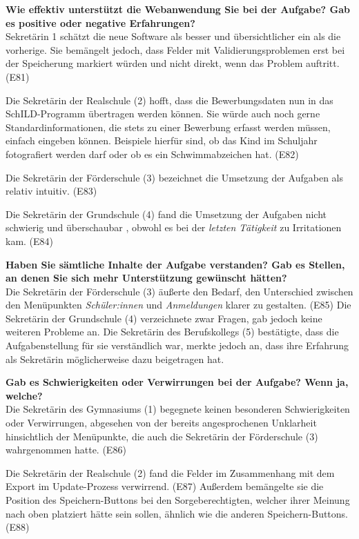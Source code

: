 \textbf{Wie effektiv unterstützt die Webanwendung Sie bei der Aufgabe?  Gab es positive oder negative Erfahrungen?}\\
Sekretärin 1 schätzt die neue Software als besser und übersichtlicher ein als die vorherige. Sie bemängelt jedoch, dass Felder mit Validierungsproblemen erst bei der Speicherung markiert würden und nicht direkt, wenn das Problem auftritt. (E81)

Die Sekretärin der Realschule (2) hofft, dass die Bewerbungsdaten nun in das SchILD-Programm übertragen werden können. Sie würde auch noch gerne \glqq Standardinformationen\grqq{}, die stets zu einer Bewerbung erfasst werden müssen, einfach eingeben können. Beispiele hierfür sind, ob das Kind im Schuljahr fotografiert werden darf oder ob es ein Schwimmabzeichen hat. (E82) 

Die Sekretärin der Förderschule (3) bezeichnet die Umsetzung der Aufgaben als \glqq relativ intuitiv\grqq{}. (E83)

Die Sekretärin der Grundschule (4) fand die Umsetzung der Aufgaben \glqq nicht schwierig\grqq{}  und \glqq überschaubar\grqq{} , obwohl es bei der \textit{letzten Tätigkeit} zu Irritationen kam. (E84)

\textbf{Haben Sie sämtliche Inhalte der Aufgabe verstanden? Gab es Stellen, an denen Sie sich mehr Unterstützung gewünscht hätten?}\\
Die Sekretärin der Förderschule (3) äußerte den Bedarf, den Unterschied zwischen den Menüpunkten \textit{Schüler:innen} und \textit{Anmeldungen} klarer zu gestalten. (E85) Die Sekretärin der Grundschule (4) verzeichnete zwar Fragen, gab jedoch keine weiteren Probleme an. Die Sekretärin des Berufskollegs (5) bestätigte, dass die Aufgabenstellung für sie verständlich war, merkte jedoch an, dass ihre Erfahrung als Sekretärin möglicherweise dazu beigetragen hat.

\textbf{Gab es Schwierigkeiten oder Verwirrungen bei der Aufgabe? Wenn ja, welche?}\\
Die Sekretärin des Gymnasiums (1) begegnete keinen besonderen Schwierigkeiten oder Verwirrungen, abgesehen von der bereits angesprochenen Unklarheit hinsichtlich der Menüpunkte, die auch die Sekretärin der Förderschule (3) wahrgenommen hatte. (E86)

Die Sekretärin der Realschule (2) fand die Felder im Zusammenhang mit dem Export im Update-Prozess verwirrend. (E87) Außerdem bemängelte sie die Position des Speichern-Buttons bei den Sorgeberechtigten, welcher ihrer Meinung nach oben platziert hätte sein sollen, ähnlich wie die anderen Speichern-Buttons. (E88)

